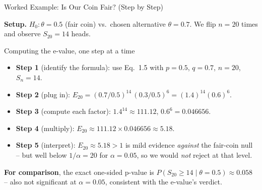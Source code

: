 \documentclass[aspectratio=169,10pt]{beamer}
\begin{document}
\begin{frame}{Worked Example: Is Our Coin Fair? (Step by Step)}

\textbf{Setup.} $H_0:\theta=0.5$ (fair coin) vs.\ chosen alternative
$\theta=0.7$. We flip $n=20$ times and observe $S_{20}=14$ heads.

\begin{block}{Computing the e-value, one step at a time}
\begin{itemize}
  \item \textbf{Step 1} (identify the formula): use Eq.\ 1.5 with
    $p=0.5$, $q=0.7$, $n=20$, $S_n=14$.
  \item \textbf{Step 2} (plug in):
    $E_{20} = (0.7/0.5)^{14}\,(0.3/0.5)^{6} = (1.4)^{14}(0.6)^{6}$.
  \item \textbf{Step 3} (compute each factor):
    $1.4^{14} \approx 111.12$, \quad $0.6^{6} = 0.046656$.
  \item \textbf{Step 4} (multiply):
    $E_{20} \approx 111.12 \times 0.046656 \approx 5.18$.
  \item \textbf{Step 5} (interpret): $E_{20}\approx 5.18 > 1$ is mild
    evidence \emph{against} the fair-coin null -- but well below
    $1/\alpha = 20$ for $\alpha=0.05$, so we would \emph{not} reject at
    that level.
\end{itemize}
\end{block}

\textbf{For comparison}, the exact one-sided p-value is
$P(S_{20}\ge 14\mid\theta=0.5) \approx 0.058$ -- also not significant at
$\alpha=0.05$, consistent with the e-value's verdict.

\end{frame}
\end{document}

